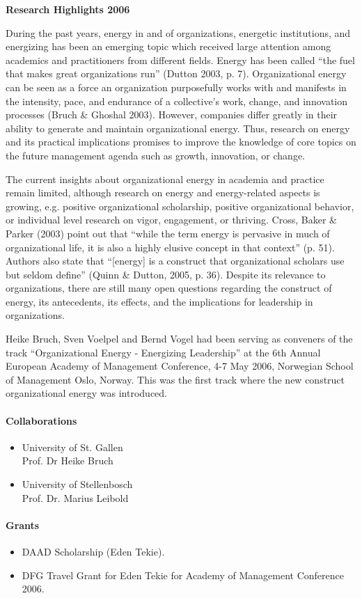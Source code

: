 \null
\textbf{Research Highlights 2006}

During the past years, energy in and of organizations, energetic institutions, and energizing has been an emerging topic which received large attention among academics and practitioners from different fields.  Energy has been called ``the fuel that makes great organizations run'' (Dutton 2003, p. 7). Organizational energy can be seen as a force an organization purposefully works with and manifests in the intensity, pace, and endurance of a collective's work, change, and innovation processes (Bruch \& Ghoshal 2003). However, companies differ greatly in their ability to generate and maintain organizational energy. Thus, research on energy and its practical implications promises to improve the knowledge of core topics on the future management agenda such as growth, innovation, or change.

The current insights about organizational energy in academia and practice remain limited, although research on energy and energy-related aspects is growing, e.g. positive organizational scholarship, positive organizational behavior, or individual level research on vigor, engagement, or thriving. Cross, Baker \& Parker (2003) point out that ``while the term energy is pervasive in much of organizational life, it is also a highly elusive concept in that context'' (p. 51). Authors also state that ``[energy] is a construct that organizational scholars use but seldom define'' (Quinn \& Dutton, 2005, p. 36).  Despite its relevance to organizations, there are still many open questions regarding the construct of energy, its antecedents, its effects, and the implications for leadership in organizations. 

\newpage
Heike Bruch, Sven Voelpel and Bernd Vogel had been serving as conveners of the track ``Organizational Energy - Energizing Leadership'' at the 6th Annual European Academy of Management Conference, 4-7 May 2006, Norwegian School of Management Oslo, Norway. This was the first track where the new construct organizational energy was introduced. 

\paragraph{Collaborations}
\begin{itemize}
\item University of St. Gallen \\ Prof. Dr Heike Bruch
\item University of Stellenbosch \\ Prof. Dr. Marius Leibold
\end{itemize}

\paragraph{Grants}
\begin{itemize}
\item DAAD Scholarship (Eden Tekie).
\item DFG Travel Grant for Eden Tekie for Academy of Management Conference 2006.
\end{itemize}
